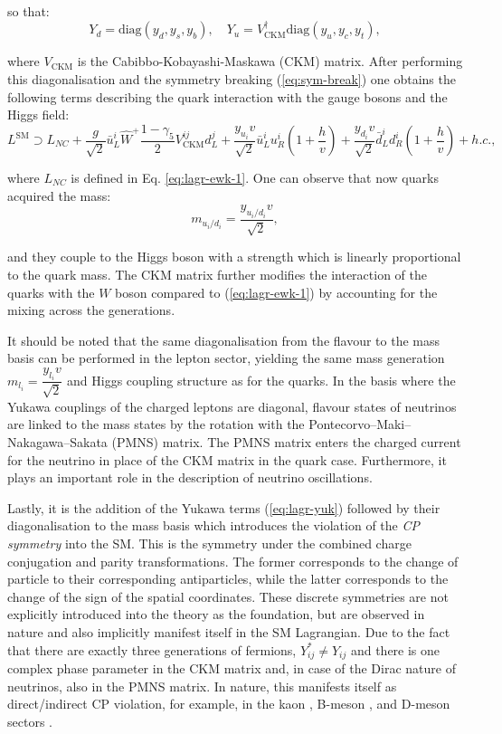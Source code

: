 so that:
\begin{equation}
    Y_d = \text{diag}(y_d, y_s, y_b), \quad Y_u = V_\text{CKM}^\dag\text{diag}(y_u, y_c, y_t),
\end{equation}

where $V_\text{CKM}$ is the Cabibbo-Kobayashi-Maskawa (CKM) matrix. After performing this diagonalisation and the symmetry breaking (\ref{eq:sym-break}) one obtains the following terms describing the quark interaction with the gauge bosons and the Higgs field:
\begin{equation}
    L^\text{SM} \supset L_{NC} + \dfrac{g}{\sqrt{2}}\bar{u}^i_L \hat{W}^+ \dfrac{1-\gamma_5}{2}V_\text{CKM}^{ij}d^j_L + \dfrac{y_{u_i}v}{\sqrt{2}}\bar{u}^i_L u^i_R\left(1+\dfrac{h}{v}\right) + \dfrac{y_{d_i}v}{\sqrt{2}}\bar{d}^i_L d^i_R\left(1+\dfrac{h}{v}\right) + h.c., 
\end{equation}

where $L_{NC}$ is defined in Eq. \ref{eq:lagr-ewk-1}. One can observe that now quarks acquired the mass:
\begin{equation}
    m_{u_i/d_i} = \dfrac{y_{u_i/d_i}v}{\sqrt{2}},
\end{equation}

and they couple to the Higgs boson with a strength which is linearly proportional to the quark mass. The CKM matrix further modifies the interaction of the quarks with the $W$ boson compared to (\ref{eq:lagr-ewk-1}) by accounting for the mixing across the generations.

It should be noted that the same diagonalisation from the flavour to the mass basis can be performed in the lepton sector, yielding the same mass generation $m_{l_i} = \dfrac{y_{l_i} v}{\sqrt{2}}$ and Higgs coupling structure as for the quarks. In the basis where the Yukawa couplings of the charged leptons are diagonal, flavour states of neutrinos are linked to the mass states by the rotation with the Pontecorvo–Maki–Nakagawa–Sakata (PMNS) matrix. The PMNS matrix enters the charged current for the neutrino in place of the CKM matrix in the quark case. Furthermore, it plays an important role in the description of neutrino oscillations.

Lastly, it is the addition of the Yukawa terms (\ref{eq:lagr-yuk}) followed by their diagonalisation to the mass basis which introduces the violation of the \textit{CP symmetry} into the SM. This is the symmetry under the combined charge conjugation and parity transformations. The former corresponds to the change of particle to their corresponding antiparticles, while the latter corresponds to the change of the sign of the spatial coordinates. These discrete symmetries are not explicitly introduced into the theory as the foundation, but are observed in nature and also implicitly manifest itself in the SM Lagrangian. Due to the fact that there are exactly three generations of fermions, $Y_{ij}^* \neq Y_{ij}$ and there is one complex phase parameter in the CKM matrix and, in case of the Dirac nature of neutrinos, also in the PMNS matrix. In nature, this manifests itself as direct/indirect CP violation, for example, in the kaon \cite{KTeV:1999kad}, B-meson \cite{LHCb:2013syl}, and D-meson sectors \cite{LHCb:2019hro}.    

